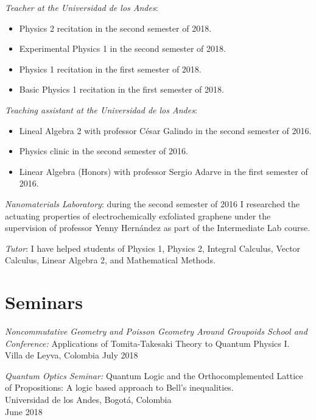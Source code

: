 \documentclass[line,margin]{res}
\begin{document}
\begin{resume}
{\sl Teacher at the Universidad de los Andes}:
\begin{itemize}

\item Physics 2 recitation in the second semester of 2018.

\item Experimental Physics 1 in the second semester of 2018.

\item Physics 1 recitation in the first semester of 2018.

\item Basic Physics 1 recitation in the first semester of 2018.

\end{itemize}

{\sl Teaching assistant at the Universidad de los Andes}: 
\begin{itemize}

\item Lineal Algebra 2 with professor César Galindo in the second semester of 2016.

\item Physics clinic in the second semester of 2016.

\item Linear Algebra (Honors) with professor Sergio Adarve in the first semester of 2016.

\end{itemize}

{\sl Nanomaterials Laboratory}: during the second semester of 2016 I researched the actuating properties of electrochemically exfoliated graphene under the supervision of professor Yenny Hernández as part of the Intermediate Lab course.
  
{\sl Tutor}: I have helped students of Physics 1, Physics 2, Integral Calculus, Vector Calculus, Linear Algebra 2, and Mathematical Methods.

\section{Seminars}

{\sl Noncommutative Geometry and Poisson Geometry Around Groupoids School and Conference:} Applications of Tomita-Takesaki Theory to Quantum Physics I.\\
Villa de Leyva, Colombia
July 2018

{\sl Quantum Optics Seminar:} Quantum Logic and the Orthocomplemented Lattice of Propositions: A logic based approach to Bell's inequalities.\\
Universidad de los Andes, Bogotá, Colombia\\
June 2018


\end{resume}
\end{document}
